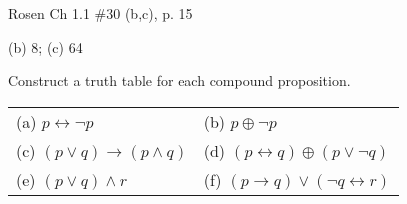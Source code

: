 \documentclass[12pt,addpoints]{exam}
\newcommand{\ra}{\rightarrow}
\newcommand{\lra}{\leftrightarrow}
\newcommand{\xor}{\oplus}
\begin{document}
\begin{questions}
\question[2] Rosen Ch 1.1 \#30 (b,c), p. 15
    \ifprintanswers
        \vspace{-10pt}
    \fi
    \begin{solution} (b) 8;  (c) 64
    \end{solution}


\question[24]\label{tt} Construct a truth table for each compound proposition.
    \begin{center}
    \begin{tabular}{ll}
       (a) $p \lra \neg p$  & (b) $p \xor \neg p$ \\
       (c) $(p \vee q) \ra (p \wedge q)$ & (d) $ (p \lra q) \xor (p \vee \neg q)$ \\
       (e) $(p \vee q) \wedge r$  & (f) $(p \ra q) \vee (\neg q \lra r)$
    \end{tabular}
    \end{center}
    \ifprintanswers
        \vspace{-10pt}
    \fi
    \begin{solution}


\end{solution}
\end{questions}
\end{document}
